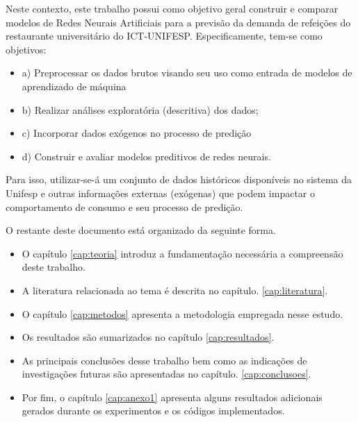 Neste contexto, este trabalho possui como objetivo geral construir e comparar modelos de Redes Neurais Artificiais para a previsão da demanda de refeições do restaurante universitário do ICT-UNIFESP. Especificamente, tem-se como objetivos:  
\begin{itemize}
\item a) Preprocessar os dados brutos visando seu uso como entrada de modelos de aprendizado de máquina
\item b) Realizar análises exploratória (descritiva) dos dados;
\item c) Incorporar dados exógenos no processo de predição
\item d) Construir e avaliar modelos preditivos de redes neurais.
\end{itemize}

Para isso, utilizar-se-á um conjunto de dados históricos disponíveis no sistema da Unifesp e outras informações externas (exógenas) que podem impactar o comportamento de consumo e seu processo de predição.

O restante deste documento está organizado da seguinte forma. 
\begin{itemize}
\item  O  capítulo \ref{cap:teoria} introduz a fundamentação necessária a compreensão deste trabalho. 
\item A literatura relacionada ao tema é descrita no capítulo. \ref{cap:literatura}. 
\item O capítulo \ref{cap:metodos} apresenta a metodologia empregada nesse estudo. 
\item Os resultados são sumarizados no capítulo \ref{cap:resultados}.
\item As principais conclusões desse trabalho bem como as indicações de investigações futuras são apresentadas no capítulo. \ref{cap:conclusoes}.
\item Por fim, o capítulo \ref{cap:anexo1} apresenta alguns resultados adicionais gerados durante os experimentos e os códigos implementados.
\end{itemize}
